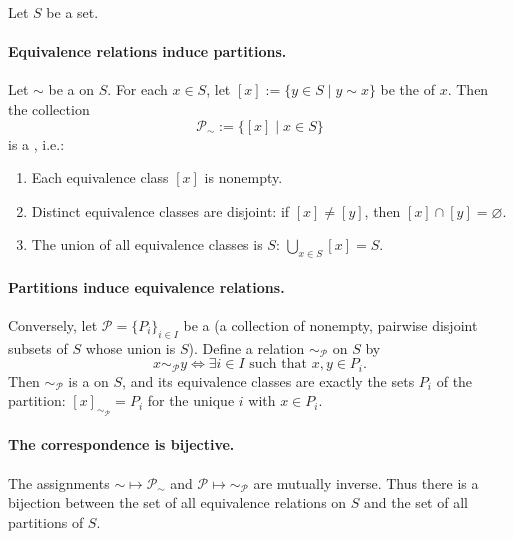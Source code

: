\begin{theorem}
\label{theorem:equivalence_relations_and_partitions}
Let $S$ be a set.

\paragraph{Equivalence relations induce partitions.}
Let $\sim$ be a  on $S$. For each $x \in S$, let $[x] := \{ y \in S \mid y \sim x \}$ be the  of $x$. Then the collection
$$ \mathcal{P}_\sim := \{ [x] \mid x \in S \} $$
is a , i.e.:
\begin{enumerate}
\item Each equivalence class $[x]$ is nonempty.
\item Distinct equivalence classes are disjoint: if $[x] \neq [y]$, then $[x] \cap [y] = \varnothing$.
\item The union of all equivalence classes is $S$: $\bigcup_{x \in S} [x] = S$.
\end{enumerate}

\paragraph{Partitions induce equivalence relations.}
Conversely, let $\mathcal{P} = \{ P_i \}_{i \in I}$ be a  (a collection of nonempty, pairwise disjoint subsets of $S$ whose union is $S$). Define a relation $\sim_\mathcal{P}$ on $S$ by
$$ x \sim_\mathcal{P} y \iff \exists i \in I \text{ such that } x, y \in P_i. $$
Then $\sim_\mathcal{P}$ is a  on $S$, and its equivalence classes are exactly the sets $P_i$ of the partition: $[x]_{\sim_\mathcal{P}} = P_i$ for the unique $i$ with $x \in P_i$.

\paragraph{The correspondence is bijective.}
The assignments $\sim \mapsto \mathcal{P}_\sim$ and $\mathcal{P} \mapsto \sim_\mathcal{P}$ are mutually inverse. Thus there is a bijection between the set of all equivalence relations on $S$ and the set of all partitions of $S$.
\end{theorem}